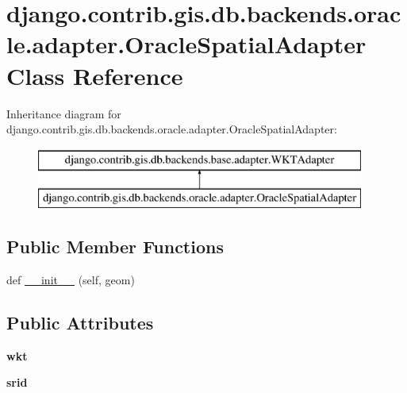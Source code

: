 \hypertarget{classdjango_1_1contrib_1_1gis_1_1db_1_1backends_1_1oracle_1_1adapter_1_1_oracle_spatial_adapter}{}\section{django.\+contrib.\+gis.\+db.\+backends.\+oracle.\+adapter.\+Oracle\+Spatial\+Adapter Class Reference}
\label{classdjango_1_1contrib_1_1gis_1_1db_1_1backends_1_1oracle_1_1adapter_1_1_oracle_spatial_adapter}
Inheritance diagram for django.\+contrib.\+gis.\+db.\+backends.\+oracle.\+adapter.\+Oracle\+Spatial\+Adapter\+:\begin{figure}[H]
\begin{center}
\leavevmode
\includegraphics[height=2.000000cm]{classdjango_1_1contrib_1_1gis_1_1db_1_1backends_1_1oracle_1_1adapter_1_1_oracle_spatial_adapter}
\end{center}
\end{figure}
\subsection*{Public Member Functions}
\begin{DoxyCompactItemize}
\item 
def \mbox{\hyperlink{classdjango_1_1contrib_1_1gis_1_1db_1_1backends_1_1oracle_1_1adapter_1_1_oracle_spatial_adapter_afe965ce4ee912f9737be321721841053}{\+\_\+\+\_\+init\+\_\+\+\_\+}} (self, geom)
\end{DoxyCompactItemize}
\subsection*{Public Attributes}
\begin{DoxyCompactItemize}
\item 
\mbox{\label{classdjango_1_1contrib_1_1gis_1_1db_1_1backends_1_1oracle_1_1adapter_1_1_oracle_spatial_adapter_a307eecc3853aad4f9108eec7646d2c10}} 
{\bfseries wkt}
\item 
\mbox{\label{classdjango_1_1contrib_1_1gis_1_1db_1_1backends_1_1oracle_1_1adapter_1_1_oracle_spatial_adapter_adf90bfc8413c4157521458a4b38feeaa}} 
{\bfseries srid}
\end{DoxyCompactItemize}
